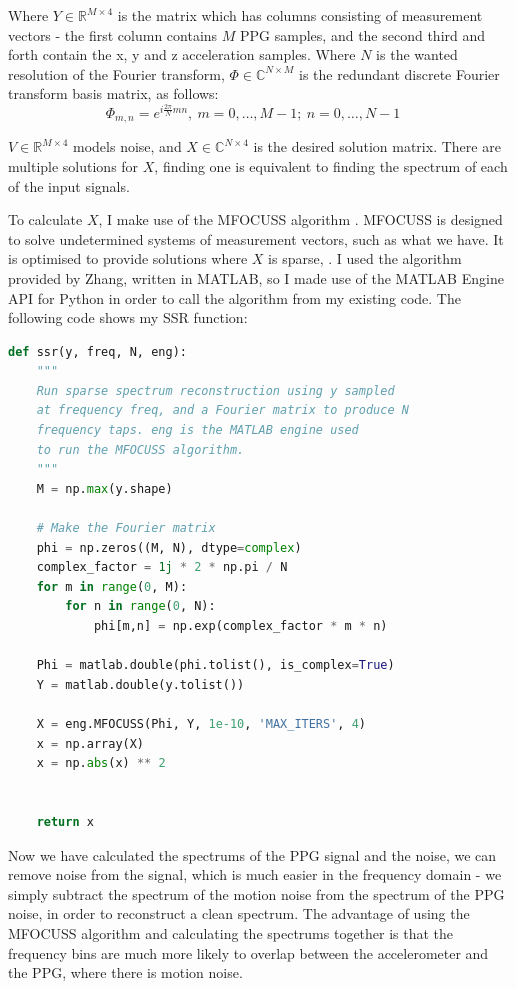 \documentclass[12pt,a4paper,twoside,openright]{report}
\begin{document}
Where $Y \in \mathbb{R}^{M \times 4}$ is the matrix which has columns consisting of measurement vectors -
the first column contains $M$ PPG samples, and the second third and forth contain
the x, y and z acceleration samples. Where $N$ is the wanted resolution of
the Fourier transform, $\Phi \in \mathbb{C}^{N \times M}$ is the redundant discrete Fourier
transform basis matrix, as follows:
$$ \Phi_{m,n} = e^{i \frac{2 \pi}{N}mn},\ m = 0,\ldots,M-1;\ n=0,\ldots,N-1
\quad $$

$V \in \mathbb{R} ^{M \times 4}$ models noise, and $X \in
\mathbb{C}^{N \times 4}$ is the desired solution matrix. There are multiple
solutions for $X$, finding one is equivalent to finding the spectrum of each
of the input signals.

To calculate $X$, I make use of the MFOCUSS algorithm \cite{Cotter05}.
MFOCUSS is designed to solve undetermined systems of measurement vectors, such
as what we have. It is optimised to provide solutions where $X$ is sparse, .
I used the
algorithm provided by Zhang, written in MATLAB, so I made use of the MATLAB
Engine API for Python in order to call the algorithm from my existing code. The 
following code shows my SSR function:

\begin{lstlisting}[language=Python]
def ssr(y, freq, N, eng):
    """
    Run sparse spectrum reconstruction using y sampled 
    at frequency freq, and a Fourier matrix to produce N 
    frequency taps. eng is the MATLAB engine used
    to run the MFOCUSS algorithm.
    """
    M = np.max(y.shape)

    # Make the Fourier matrix
    phi = np.zeros((M, N), dtype=complex)
    complex_factor = 1j * 2 * np.pi / N 
    for m in range(0, M): 
        for n in range(0, N): 
            phi[m,n] = np.exp(complex_factor * m * n)

    Phi = matlab.double(phi.tolist(), is_complex=True)
    Y = matlab.double(y.tolist())

    X = eng.MFOCUSS(Phi, Y, 1e-10, 'MAX_ITERS', 4)
    x = np.array(X)
    x = np.abs(x) ** 2


    return x
\end{lstlisting}

Now we have calculated the spectrums of the PPG signal and the noise, we can
remove noise from the signal, which is much easier in the frequency domain -
we simply subtract the spectrum of the motion noise from the spectrum of the
PPG noise, in order to reconstruct a clean spectrum. The advantage of using
the MFOCUSS algorithm and calculating the spectrums together is that the
frequency bins are much more likely to overlap between the accelerometer and
the PPG, where there is motion noise. 
\end{document}
